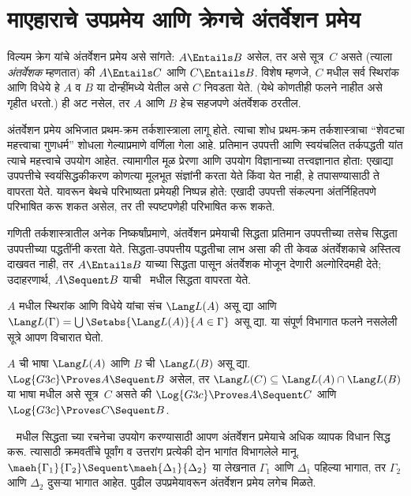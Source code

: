 \section{माएहाराचे उपप्रमेय आणि क्रेगचे अंतर्वेशन प्रमेय}\label{pt:cut:itp:sec}

विल्यम क्रेग यांचे अंतर्वेशन प्रमेय असे सांगते:
$A \Entails B$ असेल, तर असे सूत्र~$C$
असते (त्याला \emph{अंतर्वेशक} म्हणतात) की
$A \Entails C$ आणि $C \Entails B$.
विशेष म्हणजे, $C$ मधील सर्व स्थिरांक आणि
विधेये हे $A$ व $B$ या दोन्हींमध्ये येतील
असे $C$ निवडता येते. (येथे कोणतीही फलने
नाहीत असे गृहीत धरतो.) ही अट नसेल, तर
$A$ आणि $B$ हेच सहजपणे अंतर्वेशक ठरतील.

अंतर्वेशन प्रमेय अभिजात प्रथम-क्रम तर्कशास्त्राला लागू होते.
त्याचा शोध प्रथम-क्रम तर्कशास्त्राचा “शेवटचा महत्त्वाचा गुणधर्म”
शोधला गेल्याप्रमाणे वर्णिला गेला आहे.
प्रतिमान उपपत्ती आणि स्वयंचलित तर्कपद्धती यांत त्याचे
महत्त्वाचे उपयोग आहेत. त्यामागील मूळ प्रेरणा आणि
उपयोग विज्ञानाच्या तत्त्वज्ञानात होता: एखाद्या उपपत्तीचे
स्वयंसिद्धकीकरण कोणत्या मूलभूत संज्ञांनी करता येते
किंवा येत नाही, हे तपासण्यासाठी ते वापरता येते.
यावरून बेथचे परिभाष्यता प्रमेयही निष्पन्न होते:
एखादी उपपत्ती संकल्पना अंतर्निहितपणे परिभाषित करू
शकत असेल, तर ती स्पष्टपणेही परिभाषित करू शकते.

गणिती तर्कशास्त्रातील अनेक निष्कर्षांप्रमाणे,
अंतर्वेशन प्रमेयाची सिद्धता प्रतिमान उपपत्तीच्या
तसेच सिद्धता उपपत्तीच्या पद्धतींनी करता येते.
सिद्धता-उपपत्तीय पद्धतीचा लाभ असा की ती
केवळ अंतर्वेशकाचे अस्तित्व दाखवत नाही, तर
$A \Entails B$ याच्या सिद्धता पासून
अंतर्वेशक मोजून देणारी अल्गोरिदमही देते;
उदाहरणार्थ, $A \Sequent B$ याची~
मधील सिद्धता वापरता येते.

$A$ मधील स्थिरांक आणि विधेये
यांचा संच $\Lang L(A)$ असू द्या आणि
$\Lang L(\Gamma) = \bigcup \Setabs{\Lang L(A)}{A \in
\Gamma}$ असू द्या. या संपूर्ण विभागात
फलने नसलेली सूत्रे आपण विचारात घेतो.

\begin{thm}[क्रेगचे अंतर्वेशन प्रमेय]\label{pt:cut:itp:thm:interpolation}
$A$ ची भाषा $\Lang L(A)$ आणि
$B$ ची $\Lang L(B)$ असू द्या.
$\Log{G3c} \Proves A \Sequent B$ असेल, तर
$\Lang L(C) \subseteq \Lang L(A) \cap \Lang L(B)$
या भाषा मधील असे सूत्र~$C$ असते की
$\Log{G3c} \Proves A \Sequent C$
आणि $\Log{G3c} \Proves C \Sequent B$.
\end{thm}

~ मधील सिद्धता च्या रचनेचा
उपयोग करण्यासाठी आपण अंतर्वेशन प्रमेयाचे
अधिक व्यापक विधान सिद्ध करू.
त्यासाठी क्रमवर्तींचे पूर्वांग व उत्तरांग
प्रत्येकी दोन भागांत विभागलेले मानू.
$\maeh{\Gamma_1}{\Gamma_2} \Sequent
\maeh{\Delta_1}{\Delta_2}$ या लेखनात
$\Gamma_1$ आणि $\Delta_1$ पहिल्या भागात,
तर $\Gamma_2$ आणि $\Delta_2$ दुसऱ्या
भागात आहेत. पुढील उपप्रमेयावरून
अंतर्वेशन प्रमेय लगेच मिळते.

